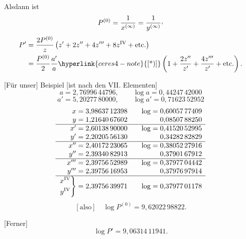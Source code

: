\hypertarget{native-391}{}Alsdann ist
\[
P^{(0)}=\frac1{x^{(\infty)}}=\frac1{y^{(\infty)}}\mathpunct{\text{\raisebox{.45ex}{,}}}
\]
\[
\begin{aligned}
P'&=\frac{2P^{(0)}}z\left(z'+2z''+4z'''+8z^{\mathrm{IV}}+\text{etc.}\right)\\
&=\frac{P^{(0)}}2\frac{a'}a\hyperlink{ceres4-note}{\text{[*)]}}\left(1+\frac{2z''}{z'}+\frac{4z'''}{z'}+\text{etc.}\right).
\end{aligned}
\]
\begingroup
\makeatletter
\long\def\@makefntext#1{\noindent[*)] #1}
\makeatother
{}
\endgroup

[Für unser] Beispiel [ist nach den VII. Elementen]
\[
a=2{,}76996\,44796,\qquad\log a=0{,}44247\,42000
\]
\noindent[und]
\[
a'=5{,}20277\,80000,\qquad\log a'=0{,}71623\,52952
\]
\[
\begin{array}{r@{\;}l@{\qquad}r@{\;}l}
x&=3{,}98637\,12398&\log=&0{,}60057\,77409\\
y&=1{,}21640\,67602&&0{,}08507\,88250\\\hline
x'&=2{,}60138\,90000&\log=&0{,}41520\,52995\\
y'&=2{,}20205\,56130&&0{,}34282\,82829\\\hline
x''&=2{,}40172\,23065&\log=&0{,}38052\,27916\\
y''&=2{,}39340\,82913&&0{,}37901\,67912\\\hline
x'''&=2{,}39756\,52989&\log=&0{,}37977\,04442\\
y'''&=2{,}39756\,16953&&0{,}37976\,97914\\\hline
\left.\begin{gathered}x^{\mathrm{IV}}\\y^{\mathrm{IV}}\end{gathered}\right\}&=2{,}39756\,39971&\log=&0{,}37977\,01178
\end{array}
\]
\[
[\text{also}]\quad\log P^{(0)}=9{,}62022\,98822.
\]

[Ferner]
\[
\log P'=9{,}06314\,11941.
\]

